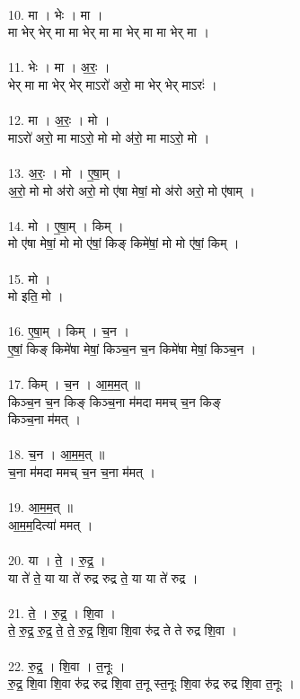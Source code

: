 \\
10. मा । भेः । मा ।\\
मा भेर् भेर् मा मा भेर् मा मा भेर् मा मा भेर् मा ।\\
\\
11. भेः । मा । अ॒रः॒ ।\\
भेर् मा मा भेर् भेर् माऽरो॑ अरो॒ मा भेर् भेर् माऽरः॑ ।\\
\\
12. मा । अ॒रः॒ । मो ।\\
माऽरो॑ अरो॒ मा माऽरो॒ मो मो अ॑रो॒ मा माऽरो॒ मो ।\\
\\
13. अ॒रः॒ । मो । ए॒षा॒म् ।\\
अ॒रो॒ मो मो अ॑रो अरो॒ मो ए॑षा मेषां॒ मो अ॑रो अरो॒ मो ए॑षाम् ।\\
\\
14. मो । ए॒षा॒म् । किम् ।\\
मो ए॑षा मेषां॒ मो मो ए॑षां॒ किङ् किमे॑षां॒ मो मो ए॑षां॒ किम् ।\\
\\
15. मो ।\\
मो इति॒ मो ।\\
\\
16. ए॒षा॒म् । किम् । च॒न ।\\
ए॒षां॒ किङ् किमे॑षा मेषां॒ किञ्च॒न च॒न किमे॑षा मेषां॒ किञ्च॒न ।\\
\\
17. किम् । च॒न । आ॒म॒म॒त् ॥\\
किञ्च॒न च॒न किङ् किञ्च॒ना म॑मदा ममच् च॒न किङ्\\
किञ्च॒ना म॑मत् ।\\
\\
18. च॒न । आ॒म॒म॒त् ॥\\
च॒ना म॑मदा ममच् च॒न च॒ना म॑मत् ।\\
\\
19. आ॒म॒म॒त् ॥\\
आ॒म॒म॒दित्या॑ ममत् ।\\
\\
20. या । ते॒ । रु॒द्र॒ ।\\
या ते॑ ते॒ या या ते॑ रुद्र रुद्र ते॒ या या ते॑ रुद्र ।\\
\\
21. ते॒ । रु॒द्र॒ । शि॒वा ।\\
ते॒ रु॒द्र॒ रु॒द्र॒ ते॒ ते॒ रु॒द्र॒ शि॒वा शि॒वा रु॑द्र ते ते रुद्र शि॒वा ।\\
\\
22. रु॒द्र॒ । शि॒वा । त॒नूः ।\\
रु॒द्र॒ शि॒वा शि॒वा रु॑द्र रुद्र शि॒वा त॒नू स्त॒नूः शि॒वा रु॑द्र रुद्र शि॒वा त॒नूः ।\\
